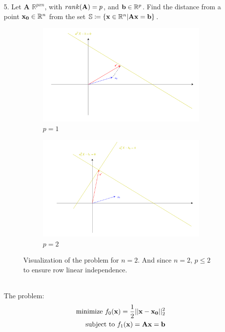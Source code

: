 \documentclass[12pt]{article}
\begin{document}
\begin{enumerate}
		\item[5.]
		Let {\bf A} $\mathbb{R}^{pxn}$, with $rank({\bf A})=p$, and ${\bf b}\in \mathbb{R}^p$. Find the distance from a point ${\bf x_0}\in \mathbb{R}^n$ from the set $\mathbb{S}\coloneqq\{{\bf x}\in \mathbb{R}^n|{\bf A}{\bf x}={\bf b}\}$.\\
		\begin{figure}[h!]
			\centering
			\begin{subfigure}[b]{0.45\textwidth}
				\centering
				\includegraphics[width=\textwidth]{4.png}
				\caption{$p=1$}
			\end{subfigure}
			\hfill
			\begin{subfigure}[b]{0.45\textwidth}
				\centering
				\includegraphics[width=\textwidth]{5a.png}
				\caption{$p=2$}
			\end{subfigure}
			\caption{Visualization of the problem for $n=2$. And since $n=2$, $p\leq 2$ to ensure row linear independence.}
		\end{figure}\\
		The problem:
		\begin{align*}
			\text{minimize }f_0({\bf x})=\frac{1}{2}||{\bf x}-{\bf x_0}||_2^2\\
			\text{subject to }f_1({\bf x}) = {\bf A}{\bf x}={\bf b}
		\end{align*}
	

\end{enumerate}
\end{document}
